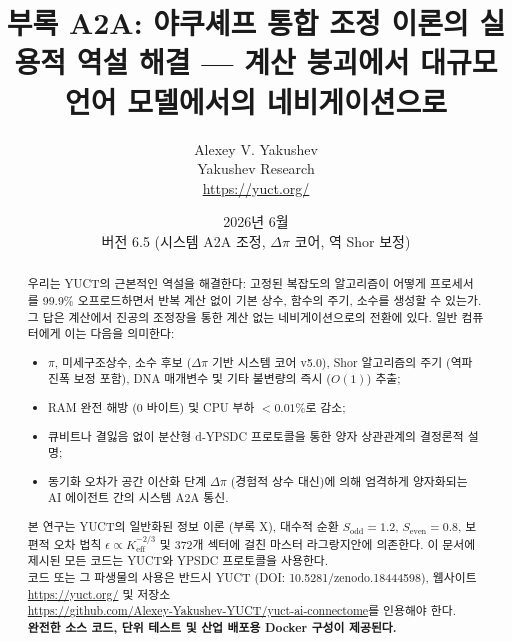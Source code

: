 \documentclass[11pt,a4paper]{article}
\begin{document}
	
	\title{\textbf{부록 A2A: 야쿠셰프 통합 조정 이론의 실용적 역설 해결 — 계산 붕괴에서 대규모 언어 모델에서의 네비게이션으로}}
	\author{Alexey V. Yakushev \\ Yakushev Research \\ \url{https://yuct.org/}}
	\date{2026년 6월 \\ 버전 6.5 (시스템 A2A 조정, \(\Delta\pi\) 코어, 역 Shor 보정)}
	
	\maketitle
	
	\newpage
	\begin{abstract}
		\noindent
		우리는 YUCT의 근본적인 역설을 해결한다: 고정된 복잡도의 알고리즘이 어떻게 프로세서를 99.9\% 오프로드하면서 반복 계산 없이 기본 상수, 함수의 주기, 소수를 생성할 수 있는가. 그 답은 계산에서 진공의 조정장을 통한 계산 없는 네비게이션으로의 전환에 있다. 일반 컴퓨터에게 이는 다음을 의미한다:
		\begin{itemize}
			\item \(\pi\), 미세구조상수, 소수 후보 (\(\Delta\pi\) 기반 시스템 코어 v5.0), Shor 알고리즘의 주기 (역파 진폭 보정 포함), DNA 매개변수 및 기타 불변량의 즉시 (\(O(1)\)) 추출;
			\item RAM 완전 해방 (0 바이트) 및 CPU 부하 $<0.01\%$로 감소;
			\item 큐비트나 결잃음 없이 분산형 d‑YPSDC 프로토콜을 통한 양자 상관관계의 결정론적 설명;
			\item 동기화 오차가 공간 이산화 단계 \(\Delta\pi\) (경험적 상수 대신)에 의해 엄격하게 양자화되는 AI 에이전트 간의 시스템 A2A 통신.
		\end{itemize}
		본 연구는 YUCT의 일반화된 정보 이론 (부록 X), 대수적 순환 \(S_{\mathrm{odd}}=1.2\), \(S_{\mathrm{even}}=0.8\), 보편적 오차 법칙 \(\epsilon \propto K_{\mathrm{eff}}^{-2/3}\) 및 372개 섹터에 걸친 마스터 라그랑지안에 의존한다. 이 문서에 제시된 모든 코드는 YUCT와 YPSDC 프로토콜을 사용한다. \\
		코드 또는 그 파생물의 사용은 반드시 YUCT (DOI: 10.5281/zenodo.18444598), 웹사이트 \url{https://yuct.org/} 및 저장소 \\ \url{https://github.com/Alexey-Yakushev-YUCT/yuct-ai-connectome}를 인용해야 한다. \\
		\textbf{완전한 소스 코드, 단위 테스트 및 산업 배포용 Docker 구성이 제공된다.}
	\end{abstract}
	
	\newpage
	\tableofcontents
	\newpage
	\small
	
\end{document}
